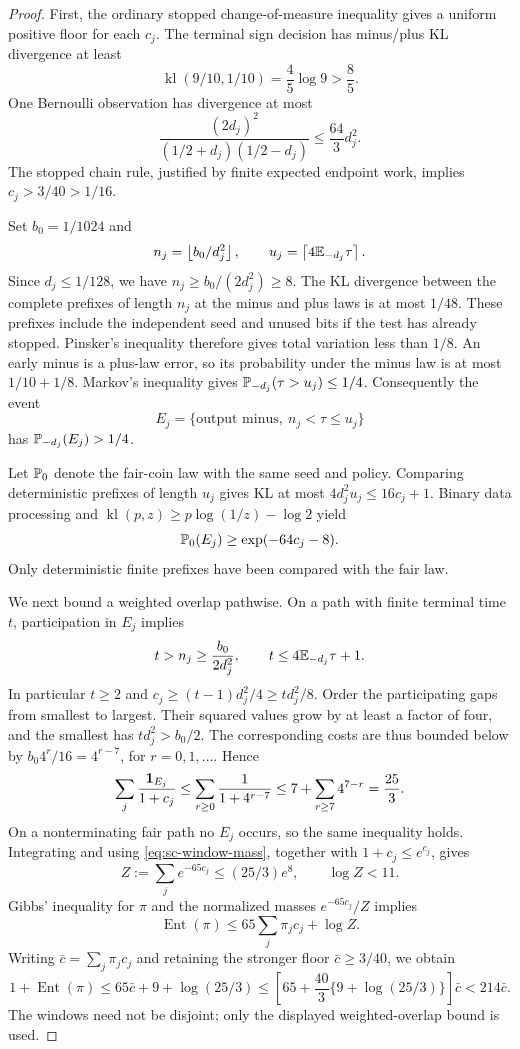 \begin{proof}
First, the ordinary stopped change-of-measure inequality gives a uniform
positive floor for each $c_j$.  The terminal sign decision has minus/plus
KL divergence at least
\[
 \operatorname{kl}(9/10,1/10)=\frac45\log9>\frac85.
\]
One Bernoulli observation has divergence at most
\[
 \frac{(2d_j)^2}{(1/2+d_j)(1/2-d_j)}\le\frac{64}{3}d_j^2.
\]
The stopped chain rule, justified by finite expected endpoint work, implies
$c_j>3/40>1/16$.

Set $b_0=1/1024$ and
\[
 n_j=\left\lfloor b_0/d_j^2\right\rfloor,\qquad
 u_j=\left\lceil4\mathbb E_{-d_j}\tau\right\rceil.
\]
Since $d_j\le1/128$, we have $n_j\ge b_0/(2d_j^2)\ge8$.
The KL divergence between the complete prefixes of length $n_j$ at the
minus and plus laws is at most $1/48$.  These prefixes include the
independent seed and unused bits if the test has already stopped.
Pinsker's inequality therefore gives total variation less than $1/8$.
An early minus is a plus-law error, so its probability under the minus law
is at most $1/10+1/8$.  Markov's inequality gives
$\mathbb P_{-d_j}(\tau>u_j)\le1/4$.  Consequently the event
\[
 E_j=\{\text{output minus},\ n_j<\tau\le u_j\}
\]
has $\mathbb P_{-d_j}(E_j)>1/4$.

Let $\mathbb P_0$ denote the fair-coin law with the same seed and policy.
Comparing deterministic prefixes of length $u_j$ gives KL at most
$4d_j^2u_j\le16c_j+1$.  Binary data processing and
$\operatorname{kl}(p,z)\ge p\log(1/z)-\log2$ yield
\begin{equation}\label{eq:sc-window-mass}
 \mathbb P_0(E_j)\ge\exp(-64c_j-8).
\end{equation}
Only deterministic finite prefixes have been compared with the fair law.

We next bound a weighted overlap pathwise.  On a path with finite terminal
time $t$, participation in $E_j$ implies
\[
 t>n_j\ge\frac{b_0}{2d_j^2},\qquad
 t\le4\mathbb E_{-d_j}\tau+1.
\]
In particular $t\ge2$ and
$c_j\ge(t-1)d_j^2/4\ge td_j^2/8$.
Order the participating gaps from smallest to largest.  Their squared
values grow by at least a factor of four, and the smallest has
$td_j^2>b_0/2$.  The corresponding costs are thus bounded below by
$b_0 4^r/16=4^{r-7}$, for $r=0,1,\ldots$.  Hence
\[
 \sum_j\frac{\mathbf 1_{E_j}}{1+c_j}
 \le\sum_{r\ge0}\frac1{1+4^{r-7}}
 \le7+\sum_{r\ge7}4^{7-r}=\frac{25}{3}.
\]
On a nonterminating fair path no $E_j$ occurs, so the same inequality
holds.  Integrating and using \eqref{eq:sc-window-mass}, together with
$1+c_j\le e^{c_j}$, gives
\[
 Z:=\sum_je^{-65c_j}\le(25/3)e^8,
 \qquad \log Z<11.
\]
Gibbs' inequality for $\pi$ and the normalized masses $e^{-65c_j}/Z$
implies
\[
 \operatorname{Ent}(\pi)\le65\sum_j\pi_jc_j+\log Z.
\]
Writing $\bar c=\sum_j\pi_jc_j$ and retaining the stronger floor
$\bar c\ge3/40$, we obtain
\[
 1+\operatorname{Ent}(\pi)
 \le65\bar c+9+\log(25/3)
 \le\left[65+\frac{40}{3}\{9+\log(25/3)\}\right]\bar c
 <214\bar c.
\]
The windows need not be disjoint; only the displayed weighted-overlap
bound is used.
\end{proof}


